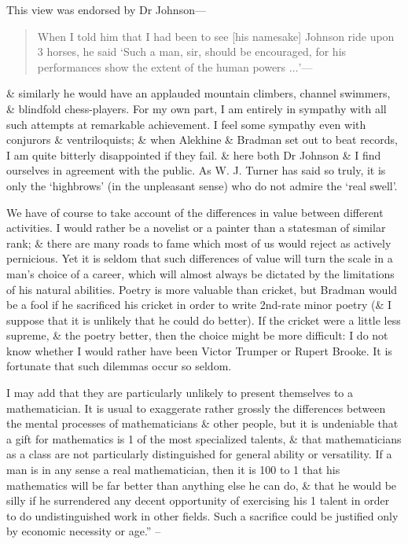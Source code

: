 \documentclass{article}
\numberwithin{equation}{section}
\begin{document}
This view was endorsed by Dr Johnson---
\begin{quotation}
	When I told him that I had been to see [his namesake] Johnson ride upon 3 horses, he said `Such a man, sir, should be encouraged, for his performances show the extent of the human powers $\ldots$'---
\end{quotation}
\& similarly he would have an applauded mountain climbers, channel swimmers, \& blindfold chess-players. For my own part, I am entirely in sympathy with all such attempts at remarkable achievement. I feel some sympathy even with conjurors \& ventriloquists; \& when Alekhine \& Bradman set out to beat records, I am quite bitterly disappointed if they fail. \& here both Dr Johnson \& I find ourselves in agreement with the public. As W. J. Turner has said so truly, it is only the `highbrows' (in the unpleasant sense) who do not admire the `real swell'.

We have of course to take account of the differences in value between different activities. I would rather be a novelist or a painter than a statesman of similar rank; \& there are many roads to fame which most of us would reject as actively pernicious. Yet it is seldom that such differences of value will turn the scale in a man's choice of a career, which will almost always be dictated by the limitations of his natural abilities. Poetry is more valuable than cricket, but Bradman would be a fool if he sacrificed his cricket in order to write 2nd-rate minor poetry (\& I suppose that it is unlikely that he could do better). If the cricket were a little less supreme, \& the poetry better, then the choice might be more difficult: I do not know whether I would rather have been Victor Trumper or Rupert Brooke. It is fortunate that such dilemmas occur so seldom.

I may add that they are particularly unlikely to present themselves to a mathematician. It is usual to exaggerate rather grossly the differences between the mental processes of mathematicians \& other people, but it is undeniable that a gift for mathematics is 1 of the most specialized talents, \& that mathematicians as a class are not particularly distinguished for general ability or versatility. If a man is in any sense a real mathematician, then it is 100 to 1 that his mathematics will be far better than anything else he can do, \& that he would be silly if he surrendered any decent opportunity of exercising his 1 talent in order to do undistinguished work in other fields. Such a sacrifice could be justified only by economic necessity or age.'' -- \cite[pp. 66--70]{Hardy1992}
\end{document}
